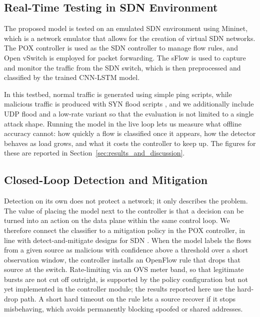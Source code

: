 \documentclass[ASNA,twocolumn]{USG} %
\begin{document}
\subsection{Real-Time Testing in SDN Environment}
The proposed model is tested on an emulated SDN environment using Mininet, which is a network emulator that allows for the creation of virtual SDN networks. The POX controller \cite{jaraba2024exploring} is used as the SDN controller to manage flow rules, and Open vSwitch is employed for packet forwarding. The sFlow is used to capture and monitor the traffic from the SDN switch, which is then preprocessed and classified by the trained CNN-LSTM model.

In this testbed, normal traffic is generated using simple ping scripts, while malicious traffic is produced with SYN flood scripts \cite{das2022flood}, and we additionally include UDP flood and a low-rate variant so that the evaluation is not limited to a single attack shape. Running the model in the live loop lets us measure what offline accuracy cannot: how quickly a flow is classified once it appears, how the detector behaves as load grows, and what it costs the controller to keep up. The figures for these are reported in Section~\ref{sec:results_and_discussion}.

\subsection{Closed-Loop Detection and Mitigation}
\label{sec:mitigation}

Detection on its own does not protect a network; it only describes the problem. The value of placing the model next to the controller is that a decision can be turned into an action on the data plane within the same control loop. We therefore connect the classifier to a mitigation policy in the POX controller, in line with detect-and-mitigate designs for SDN \cite{wang2024detection, hnamte2024ddos}. When the model labels the flows from a given source as malicious with confidence above a threshold over a short observation window, the controller installs an OpenFlow rule that drops that source at the switch. Rate-limiting via an OVS meter band, so that legitimate bursts are not cut off outright, is supported by the policy configuration but not yet implemented in the controller module; the results reported here use the hard-drop path. A short hard timeout on the rule lets a source recover if it stops misbehaving, which avoids permanently blocking spoofed or shared addresses.
\end{document}
